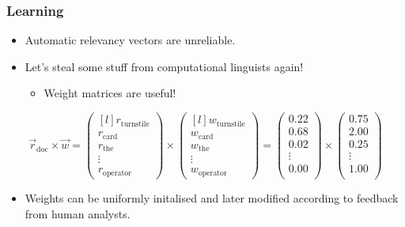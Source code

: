 \documentclass{beamer}
\begin{document}
\begin{frame}
\frametitle{Learning}
\begin{itemize}
\item Automatic relevancy vectors are unreliable.
\item Let's steal some stuff from computational linguists again!
  \begin{itemize}
  \item Weight matrices are useful!
  \end{itemize}
\end{itemize}

\[\vec{r}_\text{doc}\times \vec w=
\begin{pmatrix*}[l]
  r_\text{turnstile}\\
  r_\text{card}\\
  r_\text{the}\\
  \vdots\\
  r_\text{operator}
\end{pmatrix*}
\times
\begin{pmatrix*}[l]
  w_\text{turnstile}\\
  w_\text{card}\\
  w_\text{the}\\
  \vdots\\
  w_\text{operator}
\end{pmatrix*}
=
\begin{pmatrix}
  0.22\\
  0.68\\
  0.02\\
  \vdots\\
  0.00\\
\end{pmatrix}
\times
\begin{pmatrix}
  0.75\\
  2.00\\
  0.25\\
  \vdots\\
  1.00\\
\end{pmatrix}
\]

\begin{itemize}
\item Weights can be uniformly initalised and later modified according to feedback from human analysts.
\end{itemize}

\end{frame}

\end{document}
